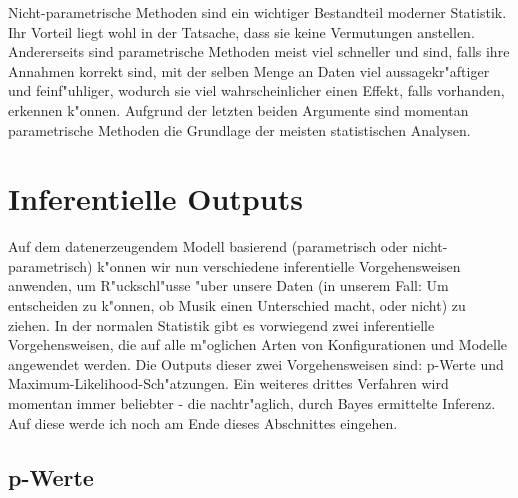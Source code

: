 \documentclass[a4paper,twoside]{tufte-book}\usepackage[]{graphicx}\usepackage[]{color}
\begin{document}
Nicht-parametrische Methoden sind ein wichtiger Bestandteil moderner Statistik. Ihr Vorteil liegt wohl in der Tatsache, dass sie keine Vermutungen anstellen. Andererseits sind parametrische Methoden meist viel schneller und sind, falls ihre Annahmen korrekt sind, mit der selben Menge an Daten viel aussagekr"aftiger und feinf"uhliger, wodurch sie viel wahrscheinlicher einen Effekt, falls vorhanden, erkennen k"onnen. Aufgrund der letzten beiden Argumente sind momentan parametrische Methoden die Grundlage der meisten statistischen Analysen.


\section{Inferentielle Outputs}

Auf dem datenerzeugendem Modell basierend (parametrisch oder nicht-parametrisch) k"onnen wir nun verschiedene inferentielle Vorgehensweisen anwenden, um R"uckschl"usse "uber unsere Daten (in unserem Fall: Um entscheiden zu k"onnen, ob Musik einen Unterschied macht, oder nicht) zu ziehen. In der normalen Statistik gibt es vorwiegend zwei inferentielle Vorgehensweisen, die auf alle m"oglichen Arten von Konfigurationen und Modelle angewendet werden. Die Outputs dieser zwei Vorgehensweisen sind: p-Werte und Maximum-Likelihood-Sch"atzungen. Ein weiteres drittes Verfahren wird momentan immer beliebter - die nachtr"aglich, durch Bayes ermittelte Inferenz. Auf diese werde ich noch am Ende dieses Abschnittes eingehen.

\subsection{p-Werte}
\end{document}
